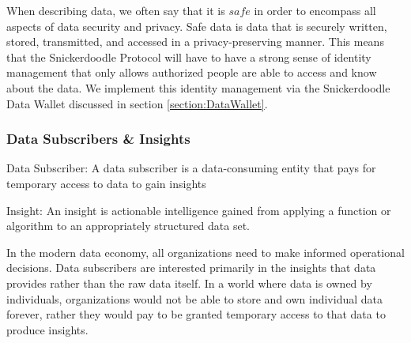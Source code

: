 When describing data, we often say that it is $\textit{safe}$ in order to encompass all aspects of data security and privacy. Safe data is data that is securely 
written, stored, transmitted, and accessed in a privacy-preserving manner. This means that the Snickerdoodle Protocol will have to have a strong sense of identity 
management that only allows authorized people are able to access and know about the data. We implement this identity management via the Snickerdoodle Data Wallet 
discussed in section \ref{section:DataWallet}. 

\subsubsection{Data Subscribers \& Insights}

\begin{definition}
\label{definition:DataSubscriber}
Data Subscriber: A data subscriber is a data-consuming entity that pays for temporary access to data to gain insights
\end{definition}

\begin{definition}
\label{definition:Insight}
Insight: An insight is actionable intelligence gained from applying a function or algorithm to an appropriately structured data set. 
\end{definition}

In the modern data economy, all organizations need to make informed operational decisions. Data subscribers are interested primarily 
in the insights that data provides rather than the raw data itself. In a world where data is owned by individuals, organizations 
would not be able to store and own individual data forever, rather they would pay to be granted temporary access to that data to produce insights.


